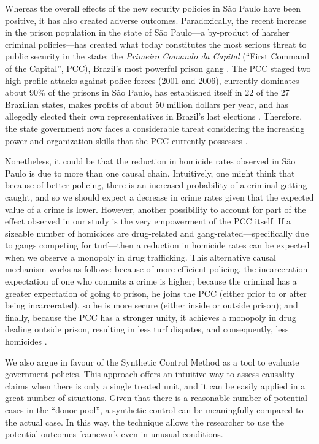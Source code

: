 \documentclass[a4paper,11pt]{article}
\begin{document}
Whereas the overall effects of the new security policies in S\~{a}o Paulo have been positive, it has also created adverse outcomes. Paradoxically, the recent increase in the prison population in the state of S\~{a}o Paulo---a by-product of harsher criminal policies---has created what today constitutes the most serious threat to public security in the state: the \textit{Primeiro Comando da Capital} (``First Command of the Capital'', PCC), Brazil's most powerful prison gang \citep{dias2009, souza2007}. The PCC staged two high-profile attacks against police forces (2001 and 2006), currently dominates about 90\% of the prisons in S\~{a}o Paulo, has established itself in 22 of the 27 Brazilian states, makes profits of about 50 million dollars per year, and has allegedly elected their own representatives in Brazil's last elections \citep{biondi2010}. Therefore, the state government now faces a considerable threat considering the increasing power and organization skills that the PCC currently possesses \citep{freire2014}.

Nonetheless, it could be that the reduction in homicide rates observed in S\~{a}o Paulo is due to more than one causal chain. Intuitively, one might think that because of better policing, there is an increased probability of a criminal getting caught, and so we should expect a decrease in crime rates given that the expected value of a crime is lower. However, another possibility to account for part of the effect observed in our study is the very empowerment of the PCC itself. If a sizeable number of homicides are drug-related and gang-related---specifically due to gangs competing for turf---then a reduction in homicide rates can be expected when we observe a monopoly in drug trafficking. This alternative causal mechanism works as follows: because of more efficient policing, the incarceration expectation of one who commits a crime is higher; because the criminal has a greater expectation of going to prison, he joins the PCC (either prior to or after being incarcerated), so he is more secure (either inside or outside prison); and finally, because the PCC has a stronger unity, it achieves a monopoly in drug dealing outside prison, resulting in less turf disputes, and consequently, less homicides \citep{skarbek2011}.

We also argue in favour of the Synthetic Control Method as a tool to evaluate government policies. This approach offers an intuitive way to assess causality claims when there is only a single treated unit, and it can be easily applied in a great number of situations. Given that there is a reasonable number of potential cases in the ``donor pool'', a synthetic control can be meaningfully compared to the actual case. In this way, the technique allows the researcher to use the potential outcomes framework even in unusual conditions. 
\end{document}
